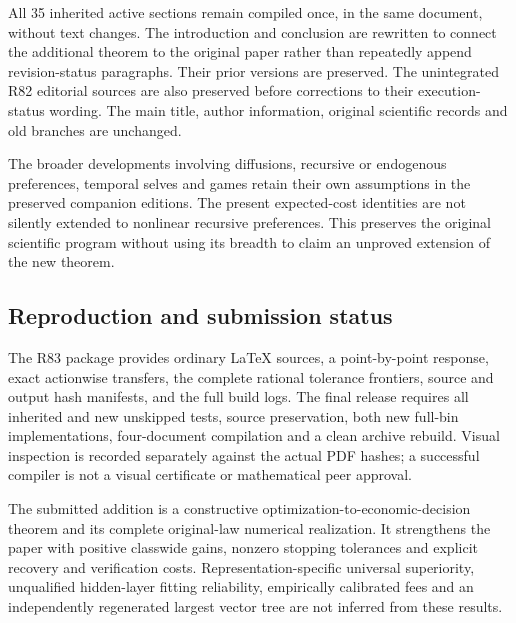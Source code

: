 All 35 inherited active sections remain compiled once, in the same
document, without text changes. The introduction and conclusion are
rewritten to connect the additional theorem to the original paper rather
than repeatedly append revision-status paragraphs. Their prior versions
are preserved. The unintegrated R82 editorial sources are also preserved
before corrections to their execution-status wording. The main title,
author information, original scientific records and old branches are
unchanged.

The broader developments involving diffusions, recursive or endogenous
preferences, temporal selves and games retain their own assumptions in
the preserved companion editions. The present expected-cost identities
are not silently extended to nonlinear recursive preferences. This
preserves the original scientific program without using its breadth to
claim an unproved extension of the new theorem.

\hypertarget{reproduction-and-submission-status}{%
\subsection{Reproduction and submission
status}\label{reproduction-and-submission-status}}

The R83 package provides ordinary LaTeX sources, a point-by-point
response, exact actionwise transfers, the complete rational tolerance
frontiers, source and output hash manifests, and the full build logs.
The final release requires all inherited and new unskipped tests, source
preservation, both new full-bin implementations, four-document
compilation and a clean archive rebuild. Visual inspection is recorded
separately against the actual PDF hashes; a successful compiler is not a
visual certificate or mathematical peer approval.

The submitted addition is a constructive
optimization-to-economic-decision theorem and its complete original-law
numerical realization. It strengthens the paper with positive classwide
gains, nonzero stopping tolerances and explicit recovery and
verification costs. Representation-specific universal superiority,
unqualified hidden-layer fitting reliability, empirically calibrated
fees and an independently regenerated largest vector tree are not
inferred from these results.
